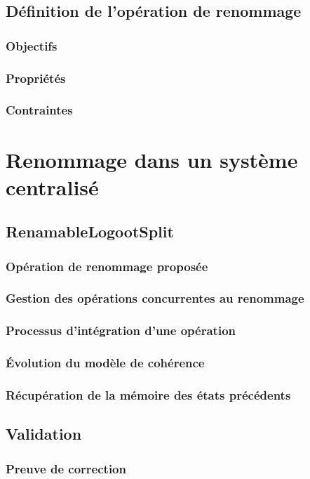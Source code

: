 \documentclass[12pt]{thesul}
\begin{document}
\section{Définition de l'opération de renommage}
\subsection{Objectifs}
\subsection{Propriétés}
\subsection{Contraintes} %

\NumberThisInToc
\chapter{Renommage dans un système centralisé}
\minitoc
\section{RenamableLogootSplit}
\subsection{Opération de renommage proposée}
\subsection{Gestion des opérations concurrentes au renommage}
\subsection{Processus d'intégration d'une opération}
\subsection{Évolution du modèle de cohérence}
\subsection{Récupération de la mémoire des états précédents}
\section{Validation}
\subsection{Preuve de correction}
\end{document}
